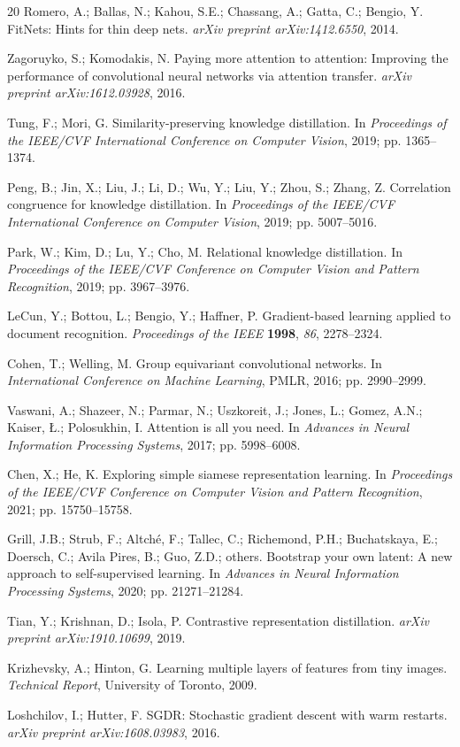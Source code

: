 \documentclass[symmetry,article,submit,moreauthors]{Definitions/mdpi}
\begin{document}
\begin{thebibliography}{20}
Romero, A.; Ballas, N.; Kahou, S.E.; Chassang, A.; Gatta, C.; Bengio, Y. FitNets: Hints for thin deep nets. \textit{arXiv preprint arXiv:1412.6550}, 2014.

Zagoruyko, S.; Komodakis, N. Paying more attention to attention: Improving the performance of convolutional neural networks via attention transfer. \textit{arXiv preprint arXiv:1612.03928}, 2016.

Tung, F.; Mori, G. Similarity-preserving knowledge distillation. In \textit{Proceedings of the IEEE/CVF International Conference on Computer Vision}, 2019; pp. 1365--1374.

Peng, B.; Jin, X.; Liu, J.; Li, D.; Wu, Y.; Liu, Y.; Zhou, S.; Zhang, Z. Correlation congruence for knowledge distillation. In \textit{Proceedings of the IEEE/CVF International Conference on Computer Vision}, 2019; pp. 5007--5016.

Park, W.; Kim, D.; Lu, Y.; Cho, M. Relational knowledge distillation. In \textit{Proceedings of the IEEE/CVF Conference on Computer Vision and Pattern Recognition}, 2019; pp. 3967--3976.

LeCun, Y.; Bottou, L.; Bengio, Y.; Haffner, P. Gradient-based learning applied to document recognition. \textit{Proceedings of the IEEE} \textbf{1998}, \textit{86}, 2278--2324.

Cohen, T.; Welling, M. Group equivariant convolutional networks. In \textit{International Conference on Machine Learning}, PMLR, 2016; pp. 2990--2999.

Vaswani, A.; Shazeer, N.; Parmar, N.; Uszkoreit, J.; Jones, L.; Gomez, A.N.; Kaiser, \L.; Polosukhin, I. Attention is all you need. In \textit{Advances in Neural Information Processing Systems}, 2017; pp. 5998--6008.

Chen, X.; He, K. Exploring simple siamese representation learning. In \textit{Proceedings of the IEEE/CVF Conference on Computer Vision and Pattern Recognition}, 2021; pp. 15750--15758.

Grill, J.B.; Strub, F.; Altch\'{e}, F.; Tallec, C.; Richemond, P.H.; Buchatskaya, E.; Doersch, C.; Avila Pires, B.; Guo, Z.D.; others. Bootstrap your own latent: A new approach to self-supervised learning. In \textit{Advances in Neural Information Processing Systems}, 2020; pp. 21271--21284.

Tian, Y.; Krishnan, D.; Isola, P. Contrastive representation distillation. \textit{arXiv preprint arXiv:1910.10699}, 2019.

Krizhevsky, A.; Hinton, G. Learning multiple layers of features from tiny images. \textit{Technical Report}, University of Toronto, 2009.

Loshchilov, I.; Hutter, F. SGDR: Stochastic gradient descent with warm restarts. \textit{arXiv preprint arXiv:1608.03983}, 2016.

\end{thebibliography}
\end{document}

